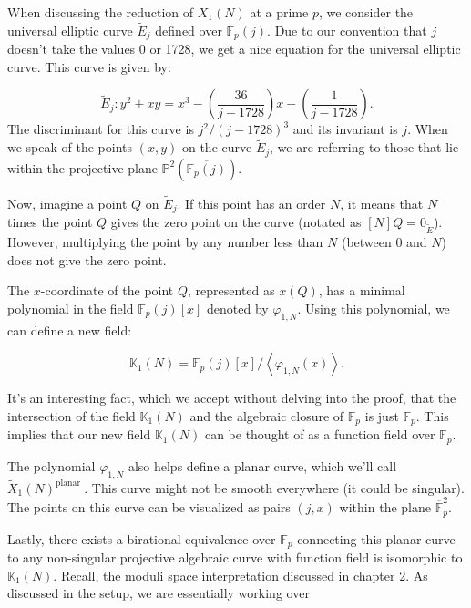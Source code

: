 When discussing the reduction of \( X_{1}(N) \) at a prime \( p \), we consider the universal elliptic curve \( \widetilde{E}_{j} \) defined over \( \mathbb{F}_{p}(j) \). Due to our convention that $j$ doesn't take the values 0 or 1728, we get a nice equation for the universal elliptic curve. 
This curve is given by:

\[
\widetilde{E}_{j}: y^{2}+x y=x^{3}-\left(\frac{36}{j-1728}\right) x-\left(\frac{1}{j-1728}\right) .
\]
The discriminant for this curve is \( j^{2} /(j-1728)^{3} \) and its invariant is \( j \). When we speak of the points \((x, y)\) on the curve \(\widetilde{E}_{j}\), we are referring to those that lie within the projective plane \(\mathbb{P}^{2}\left(\overline{\mathbb{F}_{p}(j)}\right)\). 

Now, imagine a point \(Q\) on \(\widetilde{E}_{j}\). If this point has an order \(N\), it means that \(N\) times the point \(Q\) gives the zero point on the curve (notated as \([N] Q=0_{\widetilde{E}}\)). However, multiplying the point by any number less than \(N\) (between 0 and \(N\)) does not give the zero point. 

The \(x\)-coordinate of the point \(Q\), represented as \(x(Q)\), has a minimal polynomial in the field \(\mathbb{F}_{p}(j)[x]\) denoted by \(\varphi_{1, N}\). Using this polynomial, we can define a new field:

\[
\mathbb{K}_{1}(N)=\mathbb{F}_{p}(j)[x] /\left\langle\varphi_{1, N}(x)\right\rangle .
\]

It's an interesting fact, which we accept without delving into the proof, that the intersection of the field \(\mathbb{K}_{1}(N)\) and the algebraic closure of \(\mathbb{F}_{p}\) is just \(\mathbb{F}_{p}\). This implies that our new field \(\mathbb{K}_{1}(N)\) can be thought of as a function field over \(\mathbb{F}_{p}\).

The polynomial \(\varphi_{1, N}\) also helps define a planar curve, which we'll call \(\widetilde{X}_{1}(N)^{\text {planar }}\). This curve might not be smooth everywhere (it could be singular). The points on this curve can be visualized as pairs \((j, x)\) within the plane \(\overline{\mathbb{F}}_{p}^{2}\).

Lastly, there exists a birational equivalence over \(\mathbb{F}_{p}\) connecting this planar curve to any non-singular projective algebraic curve with function field is isomorphic to \(\mathbb{K}_{1}(N)\).  Recall, the moduli space interpretation discussed in chapter 2. As discussed in the setup, we are essentially working over 

